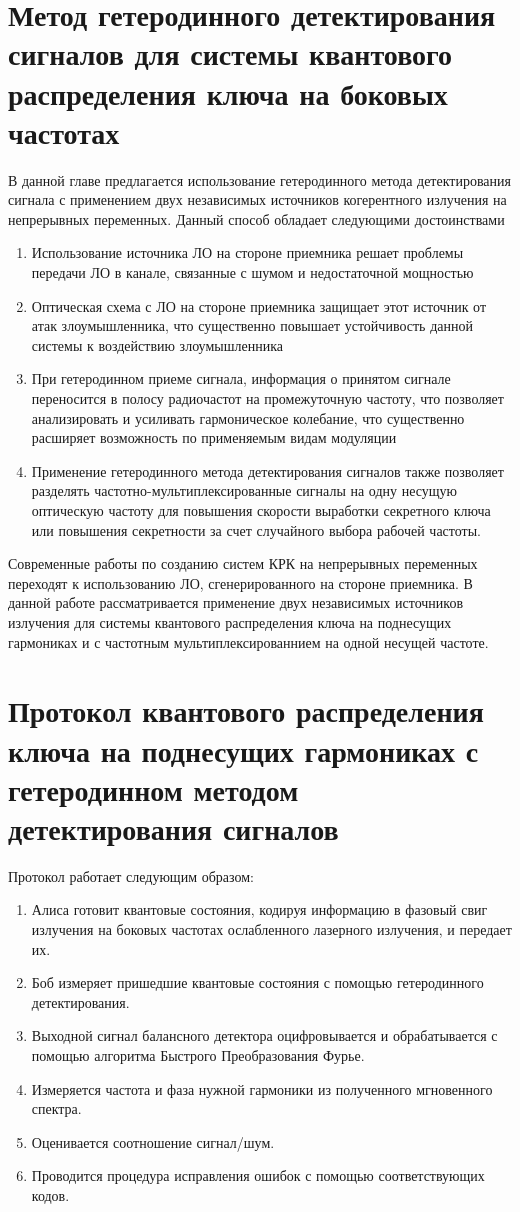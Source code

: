 \section{Метод гетеродинного детектирования сигналов для системы квантового распределения ключа на боковых частотах}\label{sec:ch3/sec1} 
В данной главе предлагается использование гетеродинного метода детектирования сигнала с применением двух независимых источников когерентного излучения на непрерывных переменных. Данный способ обладает следующими достоинствами
\begin{enumerate}
    \item Использование источника ЛО на стороне приемника решает проблемы передачи ЛО в канале, связанные с шумом и недостаточной мощностью
    \item Оптическая схема с ЛО на стороне приемника защищает этот источник от атак злоумышленника, что существенно повышает устойчивость данной системы к воздействию злоумышленника
    \item При гетеродинном приеме сигнала, информация о принятом сигнале переносится в полосу радиочастот на промежуточную частоту, что позволяет анализировать и усиливать гармоническое колебание, что существенно расширяет возможность по применяемым видам модуляции
    \item Применение гетеродинного метода детектирования сигналов также позволяет разделять частотно-мультиплексированные сигналы на одну несущую оптическую частоту для повышения скорости выработки секретного ключа или повышения секретности за счет случайного выбора рабочей частоты.
\end{enumerate}
Современные работы по созданию систем КРК на непрерывных переменных переходят к использованию ЛО, сгенерированного на стороне приемника. В данной работе рассматривается применение двух независимых источников излучения для системы квантового распределения ключа на поднесущих гармониках и с частотным мультиплексированнием на одной несущей частоте.
\section{Протокол квантового распределения ключа на поднесущих гармониках с гетеродинном методом детектирования сигналов}\label{sec:ch3/sect2}
Протокол работает следующим образом:
\begin{enumerate}
    \item Алиса готовит квантовые состояния, кодируя информацию в фазовый свиг излучения на боковых частотах ослабленного лазерного излучения, и передает их.
    \item Боб измеряет пришедшие квантовые состояния с помощью гетеродинного детектирования.
    \item Выходной сигнал балансного детектора оцифровывается и обрабатывается с помощью алгоритма Быстрого Преобразования Фурье.
    \item Измеряется частота и фаза нужной гармоники из полученного мгновенного спектра.
    \item Оценивается соотношение сигнал/шум.
    \item Проводится процедура исправления ошибок с помощью соответствующих кодов.
\end{enumerate}
